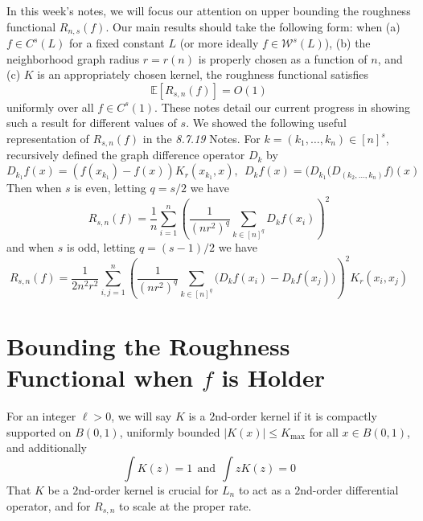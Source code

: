 \documentclass{article}
\newcommand{\abs}[1]{\left \lvert #1 \right \rvert}
\newcommand{\1}{\mathbf{1}}
\theoremstyle{alden}
\theoremstyle{aldenthm}
\theoremstyle{definition}
\theoremstyle{remark}
\begin{document}
In this week's notes, we will focus our attention on upper bounding the roughness functional $R_{n,s}(f)$. Our main results should take the following form: when (a) $f \in C^{s}(L)$ for a fixed constant $L$ (or more ideally $f \in \mathcal{W}^{s}(L)$), (b) the neighborhood graph radius $r = r(n)$ is properly chosen as a function of $n$, and (c) $K$ is an appropriately chosen kernel, the roughness functional satisfies
\begin{equation}
\label{eqn:roughness_functional_bound}
\mathbb{E}\left[R_{s,n}(f)\right] = O\left(1\right)
\end{equation}
uniformly over all $f \in C^{s}(1)$. 
These notes detail our current progress in showing such a result for different values of $s$. We showed the following useful representation of $R_{s,n}(f)$ in the \emph{8.7.19} Notes. For $k = (k_1,\ldots,k_n) \in [n]^s$, recursively defined the graph difference operator $D_k$ by 
\begin{equation*}
D_{k_1}f(x) = (f(x_{k_1}) - f(x))K_r(x_{k_1},x),~~ D_kf(x) = \bigl(D_{k_1}(D_{(k_2,\ldots,k_n)}f\bigr)(x)
\end{equation*}
Then when $s$ is even, letting $q = s/2$ we have
\begin{equation}
\label{eqn:roughness_functional_representation_even}
R_{s,n}(f) = \frac{1}{n}\sum_{i = 1}^{n} \left(\frac{1}{(nr^2)^q}\sum_{k \in [n]^q} D_kf(x_i)\right)^2
\end{equation}
and when $s$ is odd, letting $q = (s - 1)/2$ we have
\begin{equation}
\label{eqn:roughness_functional_representation_odd}
R_{s,n}(f) =  \frac{1}{2n^2r^2}\sum_{i,j = 1}^{n}\left(\frac{1}{(nr^2)^q}\sum_{k \in [n]^q}\bigl(D_kf(x_i) - D_kf(x_j)\bigr)\right)^2K_r(x_i,x_j)
\end{equation}

\section{Bounding the Roughness Functional when $f$ is Holder}

For an integer $\ell > 0$, we will say $K$ is a $2$nd-order kernel if it is compactly supported on $B(0,1)$, uniformly bounded $\abs{K(x)} \leq K_{\max}$ for all $x \in B(0,1)$, and additionally
\begin{equation*}
\int K(z) = 1 ~~\textrm{and}~~\int z K(z) = 0
\end{equation*}
That $K$ be a $2$nd-order kernel is crucial for $L_n$ to act as a $2$nd-order differential operator, and for $R_{s,n}$ to scale at the proper rate.
\end{document}
